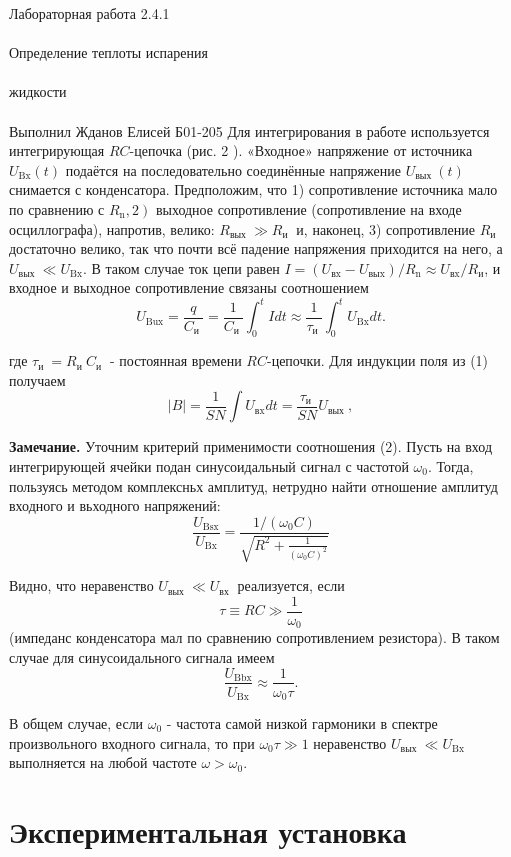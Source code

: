 \documentclass{astroedu-lab}
\begin{document}
\begin{problem}{\huge Лабораторная работа 2.4.1\\\\Определение теплоты испарения\\\\жидкости\\\\Выполнил Жданов Елисей Б01-205}
Для интегрирования в работе используется интегрирующая $R C$-цепочка (рис. 2 ). «Входное» напряжение от источника $U_{\mathrm{Bx}}(t)$ подаётся на последовательно соединённые напряжение $U_{\text {вых }}(t)$ снимается с конденсатора. Предположим, что 1) сопротивление источника мало по сравнению с $\left.R_{\mathrm{n}}, 2\right)$ выходное сопротивление (сопротивление на входе осциллографа), напротив, велико: $R_{\text {вых }} \gg R_{\text {и }}$ и, наконец, 3) сопротивление $R_{\text {и }}$ достаточно велико, так что почти всё падение напряжения приходится на него, а $U_{\text {вых }} \ll U_{\mathrm{Bx}}$. В таком случае ток цепи равен $I=\left(U_{\mathrm{вx}}-U_{\mathrm{выx}}\right) / R_{\mathrm{n}} \approx U_{\mathrm{вx}} / R_{\mathrm{и}}$, и входное и выходное сопротивление связаны соотношением
$$
U_{\mathrm{Bux}}=\frac{q}{C_{\text {и }}}=\frac{1}{C_{\text {и }}} \int_0^t I d t \approx \frac{1}{\tau_{\text {и }}} \int_0^t U_{\mathrm{Bx}} d t .
$$

где $\tau_{\text {и }}=R_{\text {и }} C_{\text {и }}$ - постоянная времени $R C$-цепочки. Для индукции поля из (1) получаем
$$
|B|=\frac{1}{S N} \int U_{\mathrm{вx}} d t=\frac{\tau_{\text {и }}}{S N} U_{\text {вых }},
$$

\textbf{Замечание.} Уточним критерий применимости соотношения (2). Пусть на вход интегрирующей ячейки подан синусоидальный сигнал с частотой $\omega_0$. Тогда, пользуясь методом комплексньх амплитуд, нетрудно найти отношение амплитуд входного и вьходного напряжений:
$$
\frac{U_{\mathrm{Bsx}}}{U_{\mathrm{Bx}}}=\frac{1 /\left(\omega_0 C\right)}{\sqrt{R^2+\frac{1}{\left(\omega_0 C\right)^2}}}
$$

Видно, что неравенство $U_{\text {вых }} \ll U_{\text {вх }}$ реализуется, если
$$
\tau \equiv R C \gg \frac{1}{\omega_0}
$$
(импеданс конденсатора мал по сравнению сопротивлением резистора). В таком случае для синусоидального сигнала имеем
$$
\frac{U_{\mathrm{Bbx}}}{U_{\mathrm{Bx}}} \approx \frac{1}{\omega_0 \tau} .
$$

В общем случае, если $\omega_0$ - частота самой низкой гармоники в спектре произвольного входного сигнала, то при $\omega_0 \tau \gg 1$ неравенство $U_{\text {вых }} \ll U_{\mathrm{Bx}}$ выполняется на любой частоте $\omega>\omega_0$.

\section{Экспериментальная установка}


\end{problem}
\end{document}

